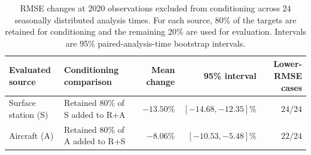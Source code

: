 \begin{table}[tbp]
\centering
\caption{RMSE changes at 2020 observations excluded from conditioning across
24 seasonally distributed analysis times. For each source, 80\% of the targets
are retained for conditioning and the remaining 20\% are used for evaluation.
Intervals are 95\% paired-analysis-time bootstrap intervals.}
\label{tab:holdout_matched_marginal}
\small
\setlength{\tabcolsep}{5pt}
\renewcommand{\arraystretch}{1.18}
\begin{tabularx}{\textwidth}{@{}l>{\raggedright\arraybackslash}Xrrr@{}}
\toprule
Evaluated source & Conditioning comparison & Mean change & 95\% interval &
Lower-RMSE cases \\
\midrule
Surface station (S) & Retained 80\% of S added to R+A &
$-13.50\%$ & $[-14.68,-12.35]\%$ & $24/24$ \\
Aircraft (A) & Retained 80\% of A added to R+S &
$-8.06\%$ & $[-10.53,-5.48]\%$ & $22/24$ \\
\bottomrule
\end{tabularx}
\end{table}